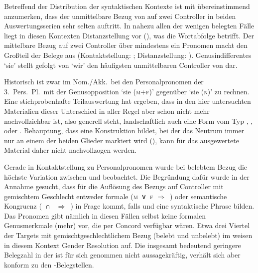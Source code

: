 Betreffend der Distribution der syntaktischen Kontexte ist mit \citet[624,
Abbildung P~179]{ksw2} übereinstimmend anzumerken, dass der unmittelbare Bezug
von  auf zwei Controller in beiden Auswertungsserien sehr selten
auftritt. In nahezu allen der wenigen belegten Fälle liegt in diesen Kontexten
Distanzstellung vor (), was die Wortabfolge betrifft. Der mittelbare Bezug auf zwei Controller
über mindestens ein Pronomen macht den Großteil der Belege aus
(Kontaktstellung: ; Distanzstellung:
\norm{\emph{PRO\tsub{i+j}} \dots\ bėide}). Genus\-indifferentes  `sie'
stellt gefolgt von \norm{wir} `wir' den häufigsten unmittelbaren Controller von
\norm{bėide} dar.

Historisch ist zwar im Nom./Akk.\ bei den Personalpronomen der 3.~Pers.\ Pl.\
mit der Genus\-opposition  `sie (\textsc{m+f})' gegenüber 
`sie (\textsc{n})' zu rechnen. Eine stichprobenhafte Teilauswertung hat
ergeben, dass in den hier untersuchten Materialien dieser Unterschied in aller
Regel aber schon nicht mehr nachvollziehbar ist, also generell \norm{si} steht,
landschaftlich auch eine Form vom Typ
\norm{sei},
,
 oder
\autocites[vgl.][213--214]{paul2007}[369, 390--397]{ksw2}[482--483]{wmu1}.
 Behauptung, dass  eine
Konstruktion bildet, bei der das Neutrum immer nur an einem der beiden Glieder
markiert wird (\q{Monoflexion}), kann für das ausgewertete Material daher
nicht nachvollzogen werden.

Gerade in Kontaktstellung zu Personalpronomen wurde bei belebtem Bezug die
höchste Variation zwischen  und  beobachtet. Die
Begründung dafür wurde in der Annahme gesucht, dass für die Auflösung des
Bezugs auf Controller mit gemischtem Geschlecht entweder formale
(\textsc{m}~∨~\textsc{f} $\Rightarrow$~\norm{-e}) oder semantische Kongruenz
(\SM{}~∩~\SF{} $\Rightarrow$~\norm{-iu}) in Frage kommt, falls  und
\norm{bėide} eine syntaktische Phrase bilden. Das Pronomen gibt nämlich in
diesen Fällen selbst keine formalen Genus\-merk\-male (mehr) vor, die per
Concord verfügbar wären. Etwa drei Viertel der Targets mit
gemischtgeschlechtlichem Bezug (belebt und unbelebt) im \CAO{} weisen in diesem
Kontext Gender Resolution auf. Die insgesamt bedeutend geringere Belegzahl in
der \KC{} ist für sich genommen nicht aussagekräftig, verhält sich aber konform
zu den \CAO-Belegstellen.

